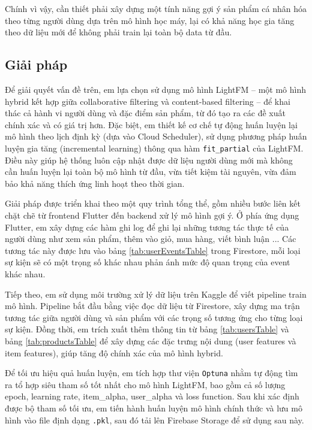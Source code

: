 \documentclass[../DoAn.tex]{subfiles}
\begin{document}
Chính vì vậy, cần thiết phải xây dựng một tính năng gợi ý sản phẩm cá nhân hóa theo từng người dùng dựa trên mô hình học máy, lại có khả năng học gia tăng theo dữ liệu mới để không phải train lại toàn bộ data từ đầu. 

\subsection{Giải pháp}

Để giải quyết vấn đề trên, em lựa chọn sử dụng mô hình LightFM – một mô hình hybrid kết hợp giữa collaborative filtering và content-based filtering – để khai thác cả hành vi người dùng và đặc điểm sản phẩm, từ đó tạo ra các đề xuất chính xác và có giá trị hơn. Đặc biệt, em thiết kế cơ chế tự động huấn luyện lại mô hình theo lịch định kỳ (dựa vào Cloud Scheduler), sử dụng phương pháp huấn luyện gia tăng (incremental learning) thông qua hàm \texttt{fit\_partial} của LightFM. Điều này giúp hệ thống luôn cập nhật được dữ liệu người dùng mới mà không cần huấn luyện lại toàn bộ mô hình từ đầu, vừa tiết kiệm tài nguyên, vừa đảm bảo khả năng thích ứng linh hoạt theo thời gian.

Giải pháp được triển khai theo một quy trình tổng thể, gồm nhiều bước liên kết chặt chẽ từ frontend Flutter đến backend xử lý mô hình gợi ý. Ở phía ứng dụng Flutter, em xây dựng các hàm ghi log để ghi lại những tương tác thực tế của người dùng như xem sản phẩm, thêm vào giỏ, mua hàng, viết bình luận ... Các tương tác này được lưu vào bảng \ref{tab:userEventsTable} trong Firestore, mỗi loại sự kiện sẽ có một trọng số khác nhau phản ánh mức độ quan trọng của event khác nhau.

Tiếp theo, em sử dụng môi trường xử lý dữ liệu trên Kaggle để viết pipeline train mô hình. Pipeline bắt đầu bằng việc đọc dữ liệu từ Firestore, xây dựng ma trận tương tác giữa người dùng và sản phẩm với các trọng số tương ứng cho từng loại sự kiện. Đồng thời, em trích xuất thêm thông tin từ bảng \ref{tab:usersTable} và bảng \ref{tab:productsTable} để xây dựng các đặc trưng nội dung (user features và item features), giúp tăng độ chính xác của mô hình hybrid.

Để tối ưu hiệu quả huấn luyện, em tích hợp thư viện \texttt{Optuna} nhằm tự động tìm ra tổ hợp siêu tham số tốt nhất cho mô hình LightFM, bao gồm cả số lượng epoch, learning rate, item\_alpha, user\_alpha và loss function. Sau khi xác định được bộ tham số tối ưu, em tiến hành huấn luyện mô hình chính thức và lưu mô hình vào file định dạng \texttt{.pkl}, sau đó tải lên Firebase Storage để sử dụng sau này.
\end{document}
